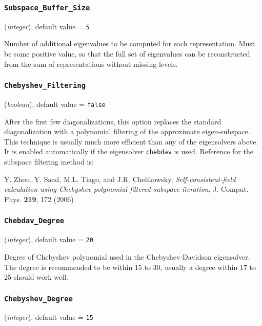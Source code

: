 \documentclass{article}
\begin{document}
\subsubsection{\tt Subspace\_Buffer\_Size 
\label{SubspaceBufferSize}}
({\it integer}),
default value = {\tt 5 }

Number of additional eigenvalues to be computed for each representation. Must
be some positive value, so that the full set of eigenvalues can be
reconstructed from the sum of representations without missing levels.

\subsubsection{\tt Chebyshev\_Filtering 
\label{ChebyshevFiltering}}
({\it boolean}),
default value = {\tt false }

After the first few diagonalizations, this option replaces the
standard diagonalization with a polynomial filtering of the
approximate eigen-subspace. 
This technique is usually much more efficient than any of the
eigensolvers above. It is enabled automatically if the eigensolver
{\tt chebdav} is used. Reference for the subspace filtering method is:

Y. Zhou, Y. Saad, M.L. Tiago, and J.R. Chelikowsky,
{\it Self-consistent-field calculation using Chebyshev
polynomial filtered subspace iteration}, J. Comput. Phys. {\bf 219}, 172 (2006)

\subsubsection{\tt Chebdav\_Degree 
\label{ChebdavDegree}}
({\it integer}),
default value = {\tt 20 }

Degree of Chebyshev polynomial used in the Chebyshev-Davidson
eigensolver. The degree is recommended to be within 15 to 30,
usually a degree within 17 to 25 should work well.

\subsubsection{\tt Chebyshev\_Degree 
\label{ChebyshevDegree}}
({\it integer}),
default value = {\tt 15 }
\end{document}
